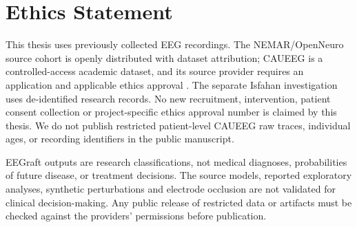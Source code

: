 \chapter*{Ethics Statement}
This thesis uses previously collected EEG recordings. The NEMAR/OpenNeuro source cohort is openly distributed with dataset attribution; CAUEEG is a controlled-access academic dataset, and its source provider requires an application and applicable ethics approval \cite{caueegofficial}. The separate Isfahan investigation uses de-identified research records. No new recruitment, intervention, patient consent collection or project-specific ethics approval number is claimed by this thesis. We do not publish restricted patient-level CAUEEG raw traces, individual ages, or recording identifiers in the public manuscript.
\par\medskip
EEGraft outputs are research classifications, not medical diagnoses, probabilities of future disease, or treatment decisions. The source models, reported exploratory analyses, synthetic perturbations and electrode occlusion are not validated for clinical decision-making. Any public release of restricted data or artifacts must be checked against the providers' permissions before publication.
\par\medskip

